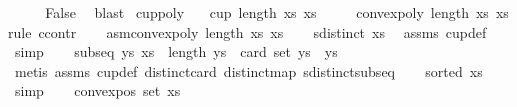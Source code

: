 \begin{isabellebody}
\isanewline
\ \ \isamarkupfalse%
\ \isamarkupfalse%
\ False\ \isamarkupfalse%
\ blast\isanewline
{}\isamarkupfalse%
%
\endisatagproof
{\isafoldproof}%
%
\isadelimproof
\isanewline
%
\endisadelimproof
\isanewline
\isanewline
\isanewline
{}\isamarkupfalse%
\ cup{\isacharunderscore}{\kern0pt}poly{\isacharcolon}{\kern0pt}\isanewline
\ \ \ {\isachardoublequoteopen}cup\ {\isacharparenleft}{\kern0pt}length\ xs{\isacharparenright}{\kern0pt}\ xs{\isachardoublequoteclose}\isanewline
\ \ \ \ \ {\isachardoublequoteopen}convex{\isacharunderscore}{\kern0pt}poly\ {\isacharparenleft}{\kern0pt}length\ xs{\isacharparenright}{\kern0pt}\ xs{\isachardoublequoteclose}\isanewline
%
\isadelimproof
%
\endisadelimproof
%
\isatagproof
{}\isamarkupfalse%
{\isacharparenleft}{\kern0pt}rule\ ccontr{\isacharparenright}{\kern0pt}\isanewline
\ \ \isamarkupfalse%
\ asm{\isacharcolon}{\kern0pt}{\isachardoublequoteopen}{\isasymnot}convex{\isacharunderscore}{\kern0pt}poly\ {\isacharparenleft}{\kern0pt}length\ xs{\isacharparenright}{\kern0pt}\ xs{\isachardoublequoteclose}\isanewline
\ \ \isamarkupfalse%
\ {}{\isacharcolon}{\kern0pt}{\isachardoublequoteopen}sdistinct\ xs{\isachardoublequoteclose}\ \isamarkupfalse%
\ assms\ cup{\isacharunderscore}{\kern0pt}def\ \isamarkupfalse%
\ simp\isanewline
\ \ \isamarkupfalse%
\ {}{\isacharcolon}{\kern0pt}{\isachardoublequoteopen}subseq\ ys\ xs\ {\isasymLongrightarrow}\ length\ ys\ {\isacharequal}{\kern0pt}\ card\ {\isacharparenleft}{\kern0pt}set\ ys{\isacharparenright}{\kern0pt}{\isachardoublequoteclose}\ \ ys\isanewline
\ \ \ \ \isamarkupfalse%
\ {\isacharparenleft}{\kern0pt}metis\ assms\ cup{\isacharunderscore}{\kern0pt}def\ distinct{\isacharunderscore}{\kern0pt}card\ distinct{\isacharunderscore}{\kern0pt}map\ sdistinct{\isacharunderscore}{\kern0pt}subseq{\isacharparenright}{\kern0pt}\isanewline
\ \ \isamarkupfalse%
\ {}{\isacharcolon}{\kern0pt}{\isachardoublequoteopen}sorted\ xs{\isachardoublequoteclose}\ \isamarkupfalse%
\ {}\ \isamarkupfalse%
\ simp\isanewline
\ \ \isamarkupfalse%
\ {\isachardoublequoteopen}{\isasymnot}convex{\isacharunderscore}{\kern0pt}pos\ {\isacharparenleft}{\kern0pt}set\ xs{\isacharparenright}{\kern0pt}{\isachardoublequoteclose}\ \isamarkupfalse%

\end{isabellebody}
